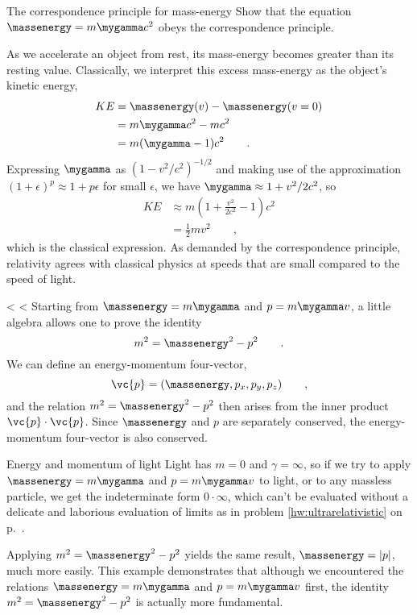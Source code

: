 \begin{eg}{The correspondence principle for mass-energy}
\egquestion Show that the equation $\massenergy=m\mygamma c^2$ obeys the correspondence principle.

\eganswer As we accelerate an object from rest, its mass-energy becomes greater than
its resting value. Classically, we interpret this excess mass-energy as the object's
kinetic energy,
\begin{align*}
  KE   &= \massenergy(v)-\massenergy(v=0) \\
       &= m\mygamma c^2 - m c^2 \\
       &= m(\mygamma-1)c^2 \qquad .
\end{align*}
Expressing $\mygamma$ as $\left(1-v^2/c^2\right)^{-1/2}$ and making use of the
approximation $(1+\epsilon)^p\approx 1+p\epsilon$ for small $\epsilon$, we have
$\mygamma\approx 1+v^2/2c^2$, so
\begin{align*}
  KE   &\approx m(1+\frac{v^2}{2c^2}-1)c^2 \\
       &= \frac{1}{2}mv^2 \qquad ,
\end{align*}
which is the classical expression. As demanded by the correspondence principle,
relativity agrees with classical physics at speeds that are small compared to
the speed of light.
\end{eg}

<%
<%
Starting from $\massenergy=m\mygamma$ and $p=m\mygamma v$, a little algebra allows one to prove the identity
\begin{equation*}
  m^2 = \massenergy^2 - p^2 \qquad .
\end{equation*}
We can define an energy-momentum four-vector,
\begin{equation*}
  \vc{p} = (\massenergy,p_x,p_y,p_z) \qquad ,
\end{equation*}
and the relation $m^2 = \massenergy^2 - p^2$ then arises from the inner product $\vc{p}\cdot\vc{p}$.
Since $\massenergy$ and $p$ are separately conserved, the energy-momentum four-vector is also conserved.

\begin{eg}{Energy and momentum of light}\label{eg:light-p-from-four-vector}
Light has $m=0$ and $\gamma=\infty$, so if we try to apply $\massenergy=m\mygamma$ and $p=m\mygamma v$ to light,
or to any massless particle, we get the indeterminate form $0\cdot\infty$, which can't be evaluated without
a delicate and laborious evaluation of limits as in problem \ref{hw:ultrarelativistic}
on p.~\pageref{hw:ultrarelativistic}.

Applying $m^2 = \massenergy^2 - p^2$ yields the same result, $\massenergy=|p|$, much more easily. This example
demonstrates that although we encountered the relations $\massenergy=m\mygamma$ and $p=m\mygamma v$ first,
the identity $m^2 = \massenergy^2 - p^2$ is actually more fundamental.
\end{eg}


